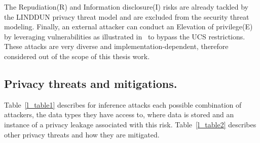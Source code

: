 The Repudiation(R) and Information disclosure(I) risks are already tackled by the LINDDUN privacy threat model and are excluded from the security threat modeling. Finally, an external attacker can conduct an Elevation of privilege(E) by leveraging vulnerabilities as illustrated in~\cite{Babil2013} to bypass the UCS restrictions. These attacks are very diverse and implementation-dependent, therefore considered out of the scope of this thesis work.

\subsection{Privacy threats and mitigations.}
\label{ss_privacy_threats_and_mitigations} 

 Table~\ref{l_table1} describes for inference attacks each possible combination of attackers, the data types they have access to, where data is stored and an instance of a privacy leakage associated with this risk. Table~\ref{l_table2} describes other privacy threats and how they are mitigated.

\begin{table}[h]
    \caption{Inference attacks according to the attackers' profile}
    \label{l_table1}
  \end{table}
  
